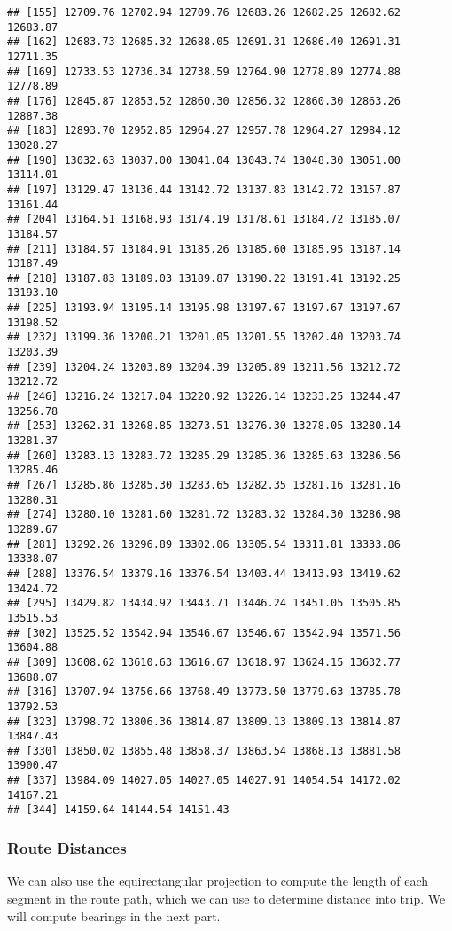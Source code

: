 \documentclass[11pt]{article}\usepackage[]{graphicx}\usepackage[]{color}
\makeatletter
\newenvironment{kframe}{%
 \def\at@end@of@kframe{}%
 \ifinner\ifhmode%
  \def\at@end@of@kframe{\end{minipage}}%
  \begin{minipage}{\columnwidth}%
 \fi\fi%
 \def\FrameCommand##1{\hskip\@totalleftmargin \hskip-\fboxsep
 \colorbox{shadecolor}{##1}\hskip-\fboxsep
     \hskip-\linewidth \hskip-\@totalleftmargin \hskip\columnwidth}%
 \MakeFramed {\advance\hsize-\width
   \@totalleftmargin\z@ \linewidth\hsize
   \@setminipage}}%
 {\par\unskip\endMakeFramed%
 \at@end@of@kframe}
\newenvironment{knitrout}{}{} %
\makeatother
\begin{document}
\begin{knitrout}
\begin{kframe}
\begin{verbatim}
## [155] 12709.76 12702.94 12709.76 12683.26 12682.25 12682.62 12683.87
## [162] 12683.73 12685.32 12688.05 12691.31 12686.40 12691.31 12711.35
## [169] 12733.53 12736.34 12738.59 12764.90 12778.89 12774.88 12778.89
## [176] 12845.87 12853.52 12860.30 12856.32 12860.30 12863.26 12887.38
## [183] 12893.70 12952.85 12964.27 12957.78 12964.27 12984.12 13028.27
## [190] 13032.63 13037.00 13041.04 13043.74 13048.30 13051.00 13114.01
## [197] 13129.47 13136.44 13142.72 13137.83 13142.72 13157.87 13161.44
## [204] 13164.51 13168.93 13174.19 13178.61 13184.72 13185.07 13184.57
## [211] 13184.57 13184.91 13185.26 13185.60 13185.95 13187.14 13187.49
## [218] 13187.83 13189.03 13189.87 13190.22 13191.41 13192.25 13193.10
## [225] 13193.94 13195.14 13195.98 13197.67 13197.67 13197.67 13198.52
## [232] 13199.36 13200.21 13201.05 13201.55 13202.40 13203.74 13203.39
## [239] 13204.24 13203.89 13204.39 13205.89 13211.56 13212.72 13212.72
## [246] 13216.24 13217.04 13220.92 13226.14 13233.25 13244.47 13256.78
## [253] 13262.31 13268.85 13273.51 13276.30 13278.05 13280.14 13281.37
## [260] 13283.13 13283.72 13285.29 13285.36 13285.63 13286.56 13285.46
## [267] 13285.86 13285.30 13283.65 13282.35 13281.16 13281.16 13280.31
## [274] 13280.10 13281.60 13281.72 13283.32 13284.30 13286.98 13289.67
## [281] 13292.26 13296.89 13302.06 13305.54 13311.81 13333.86 13338.07
## [288] 13376.54 13379.16 13376.54 13403.44 13413.93 13419.62 13424.72
## [295] 13429.82 13434.92 13443.71 13446.24 13451.05 13505.85 13515.53
## [302] 13525.52 13542.94 13546.67 13546.67 13542.94 13571.56 13604.88
## [309] 13608.62 13610.63 13616.67 13618.97 13624.15 13632.77 13688.07
## [316] 13707.94 13756.66 13768.49 13773.50 13779.63 13785.78 13792.53
## [323] 13798.72 13806.36 13814.87 13809.13 13809.13 13814.87 13847.43
## [330] 13850.02 13855.48 13858.37 13863.54 13868.13 13881.58 13900.47
## [337] 13984.09 14027.05 14027.05 14027.91 14054.54 14172.02 14167.21
## [344] 14159.64 14144.54 14151.43
\end{verbatim}
\end{kframe}
\end{knitrout}


\subsubsection{Route Distances}

We can also use the equirectangular projection to compute the length of each segment in the route
path, which we can use to determine distance into trip.
We will compute bearings in the next part.
\end{document}
